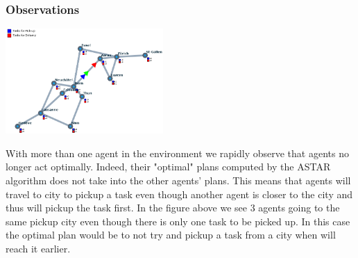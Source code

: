 \documentclass[11pt]{article}
\begin{document}
\subsubsection{Observations}
\begin{center}
\includegraphics[width=6cm]{follow.png}
\end{center}
With more than one agent in the environment we rapidly observe that agents no longer act optimally. Indeed, their "optimal" plans computed by the ASTAR algorithm does not take into the other agents' plans. This means that agents will travel to  city to pickup a task even though another agent is closer to the city and thus will pickup the task first. In the figure above we see 3 agents going to the same pickup city even though there is only one task to be picked up. In this case the optimal plan would be to not try and pickup a task from a city when will reach it earlier. 
\end{document}
